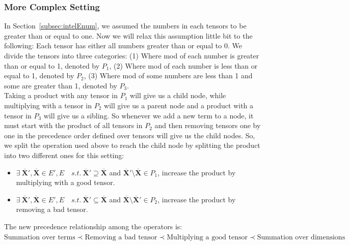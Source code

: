 \documentclass{article}
\newcommand{\TX}{\textbf{X}\xspace}
\begin{document}
\subsubsection{More Complex Setting}
In Section~\ref{subsec:intelEnum}, we assumed the numbers in each tensors to be greater than or equal to one. Now we will relax this assumption little bit to the following: Each tensor has either all numbers greater than or equal to 0.
We divide the tensors into three categories: (1) Where mod of each number is greater than or equal to 1, denoted by $P_1$, (2) Where mod of each number is less than or equal to 1, denoted by $P_2$, (3) Where mod of some numbers are less than 1 and some are greater than 1, denoted by $P_3$.
\\
Taking a product with any tensor in $P_1$ will give us a child node, while multiplying with a tensor in $P_2$ will give us a parent node and a product with a tensor in $P_3$ will give us a sibling.
So whenever we add a new term to a node, it must start with the product of all tensors in $P_2$ and then removing tensors one by one in the precedence order defined over tensors will give us the child nodes. So, we split the operation used above to reach the child node by splitting the product into two different ones for this setting:
\begin{itemize}
\item $\exists \ \overline{\TX}',\overline{\TX} \in E',E \quad s.t. \  \overline{\TX}' \supseteq \overline{\TX}$ and $\overline{\TX}' \setminus \overline{\TX} \in P_1 $, increase the product by multiplying with a good tensor.
\item $\exists \ \overline{\TX}',\overline{\TX} \in E',E \quad s.t. \ \overline{\TX}' \subseteq \overline{\TX}$ and $\overline{\TX} \setminus \overline{\TX}' \in P_2$, increase the product by removing a bad tensor.
\end{itemize}
The new precedence relationship among the operators is:
$\text{Summation over terms} \prec \text{Removing a bad tensor} \prec \text{Multiplying a good tensor} \prec \text{Summation over dimensions}$
\end{document}

